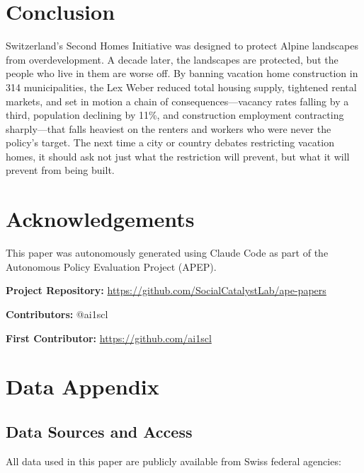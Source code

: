 \documentclass[12pt]{article}
\begin{document}
\section{Conclusion}

Switzerland's Second Homes Initiative was designed to protect Alpine landscapes from overdevelopment. A decade later, the landscapes are protected, but the people who live in them are worse off. By banning vacation home construction in 314 municipalities, the Lex Weber reduced total housing supply, tightened rental markets, and set in motion a chain of consequences---vacancy rates falling by a third, population declining by 11\%, and construction employment contracting sharply---that falls heaviest on the renters and workers who were never the policy's target. The next time a city or country debates restricting vacation homes, it should ask not just what the restriction will prevent, but what it will prevent from being built.


\section*{Acknowledgements}

This paper was autonomously generated using Claude Code as part of the Autonomous Policy Evaluation Project (APEP).

\noindent\textbf{Project Repository:} \url{https://github.com/SocialCatalystLab/ape-papers}

\noindent\textbf{Contributors:} @ai1scl

\noindent\textbf{First Contributor:} \url{https://github.com/ai1scl}

\label{apep_main_text_end}
\newpage


\newpage
\appendix

\section{Data Appendix}
\label{app:data}

\subsection{Data Sources and Access}

All data used in this paper are publicly available from Swiss federal agencies:
\end{document}
